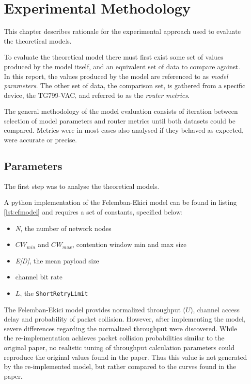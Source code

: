 \chapter{Experimental Methodology}

This chapter describes rationale for the experimental approach used to evaluate
the theoretical models.

To evaluate the theoretical model there must first exist some set of values
produced by the model itself, and an equivalent set of data to compare against.
In this report, the values produced by the model are referenced to as
\emph{model parameters}. The other set of data, the comparison set, is gathered
from a specific device, the TG799-VAC, and referred to as the \emph{router
metrics}.

The general methodology of the model evaluation consists of iteration between
selection of model parameters and router metrics until both datasets could be
compared. Metrics were in most cases also analysed if they behaved as expected,
were accurate or precise.

\section{Parameters}
The first step was to analyse the theoretical models.

A python implementation of the Felemban-Ekici model can be found in listing
\ref{lst:efmodel} and requires a set of constants, specified below:

\begin{itemize}
	\item \emph{N}, the number of network nodes
	\item $CW_{min}$ and $CW_{max}$, contention window min and max size
	\item \emph{E[D]}, the mean payload size
	\item channel bit rate
	\item $L$, the \texttt{ShortRetryLimit}
\end{itemize}

The Felemban-Ekici model provides normalized throughput ($U$), channel access
delay and probability of packet collision. However, after implementing the
model, severe differences regarding the normalized throughput were discovered.
While the re-implementation achieves packet collision probabilities similar to
the original paper, no realistic tuning of throughput calculation parameters
could reproduce the original values found in the paper. Thus this value is not
generated by the re-implemented model, but rather compared to the curves found
in the paper.

